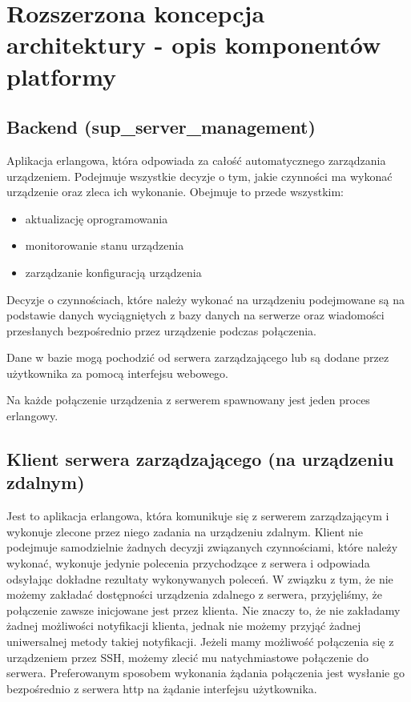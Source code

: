 \documentclass[polish,12pt]{aghthesis}
\begin{document}
\section{Rozszerzona koncepcja architektury - opis komponentów platformy}

\subsection{Backend (sup\_server\_management)}
Aplikacja erlangowa, która odpowiada za całość automatycznego zarządzania urządzeniem. Podejmuje wszystkie decyzje o tym, jakie czynności ma wykonać urządzenie oraz zleca ich wykonanie. Obejmuje to przede wszystkim:

\begin{itemize}
\item aktualizację oprogramowania
\item monitorowanie stanu urządzenia
\item zarządzanie konfiguracją urządzenia
\end{itemize}

Decyzje o czynnościach, które należy wykonać na urządzeniu podejmowane są na podstawie danych wyciągniętych z bazy danych na serwerze oraz wiadomości przesłanych bezpośrednio przez urządzenie podczas połączenia.

Dane w bazie mogą pochodzić od serwera zarządzającego lub są dodane przez użytkownika za pomocą interfejsu webowego.

Na każde połączenie urządzenia z serwerem spawnowany jest jeden proces erlangowy.

\subsection{Klient serwera zarządzającego (na urządzeniu zdalnym)}
Jest to aplikacja erlangowa, która komunikuje się z serwerem zarządzającym i wykonuje zlecone przez niego zadania na urządzeniu zdalnym. Klient nie podejmuje samodzielnie żadnych decyzji związanych czynnościami, które należy wykonać, wykonuje jedynie polecenia przychodzące z serwera i odpowiada odsyłając dokładne rezultaty wykonywanych poleceń. W związku z tym, że nie możemy zakładać dostępności urządzenia zdalnego z serwera, przyjęliśmy, że połączenie zawsze inicjowane jest przez klienta. Nie znaczy to, że nie zakładamy żadnej możliwości notyfikacji klienta, jednak nie możemy przyjąć żadnej uniwersalnej metody takiej notyfikacji. Jeżeli mamy możliwość połączenia się z urządzeniem przez SSH, możemy zlecić mu natychmiastowe połączenie do serwera. Preferowanym sposobem wykonania żądania połączenia jest wysłanie go bezpośrednio z serwera http na żądanie interfejsu użytkownika.
\end{document}
